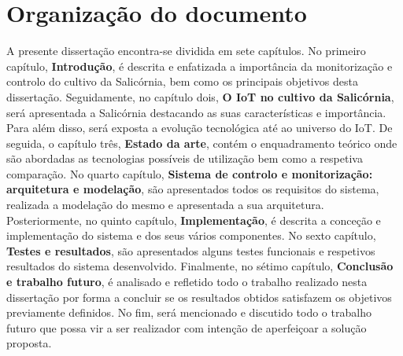 \section{Organização do documento}


A presente dissertação encontra-se dividida em sete capítulos. No primeiro capítulo, \textbf{Introdução}, é descrita e enfatizada a importância da monitorização e controlo do cultivo da Salicórnia, bem como os principais objetivos desta dissertação. Seguidamente, no capítulo dois, \textbf{O \ac{IoT} no cultivo da Salicórnia}, será apresentada a Salicórnia destacando as suas características e importância. Para além disso, será  
exposta a evolução tecnológica até ao universo do \ac{IoT}. De seguida, o capítulo três, \textbf{Estado da arte}, contém o enquadramento teórico onde são abordadas as tecnologias possíveis de utilização bem como a respetiva comparação. No quarto capítulo, \textbf{Sistema de controlo e monitorização: arquitetura e modelação}, são apresentados todos os requisitos do sistema, realizada a modelação do mesmo e apresentada a sua arquitetura. Posteriormente, no quinto capítulo, \textbf{Implementação}, é descrita a conceção e implementação do sistema e dos seus vários componentes. No sexto capítulo,\textbf{ Testes e resultados}, são apresentados alguns testes funcionais e respetivos resultados do sistema desenvolvido. Finalmente, no sétimo capítulo, \textbf{Conclusão e trabalho futuro}, é analisado e refletido todo o trabalho realizado nesta dissertação por forma a concluir se os resultados obtidos satisfazem os objetivos previamente definidos. No fim, será mencionado e discutido todo o trabalho futuro que possa vir a ser realizador com intenção de aperfeiçoar a solução proposta. 















